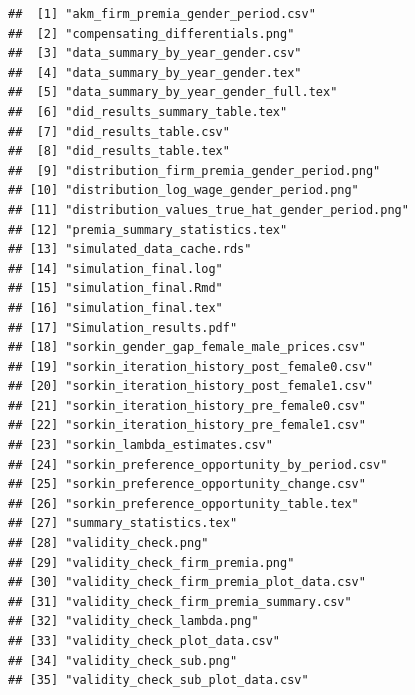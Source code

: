 \documentclass[
]{article}
\begin{document}
\begin{verbatim}
##  [1] "akm_firm_premia_gender_period.csv"             
##  [2] "compensating_differentials.png"                
##  [3] "data_summary_by_year_gender.csv"               
##  [4] "data_summary_by_year_gender.tex"               
##  [5] "data_summary_by_year_gender_full.tex"          
##  [6] "did_results_summary_table.tex"                 
##  [7] "did_results_table.csv"                         
##  [8] "did_results_table.tex"                         
##  [9] "distribution_firm_premia_gender_period.png"    
## [10] "distribution_log_wage_gender_period.png"       
## [11] "distribution_values_true_hat_gender_period.png"
## [12] "premia_summary_statistics.tex"                 
## [13] "simulated_data_cache.rds"                      
## [14] "simulation_final.log"                          
## [15] "simulation_final.Rmd"                          
## [16] "simulation_final.tex"                          
## [17] "Simulation_results.pdf"                        
## [18] "sorkin_gender_gap_female_male_prices.csv"      
## [19] "sorkin_iteration_history_post_female0.csv"     
## [20] "sorkin_iteration_history_post_female1.csv"     
## [21] "sorkin_iteration_history_pre_female0.csv"      
## [22] "sorkin_iteration_history_pre_female1.csv"      
## [23] "sorkin_lambda_estimates.csv"                   
## [24] "sorkin_preference_opportunity_by_period.csv"   
## [25] "sorkin_preference_opportunity_change.csv"      
## [26] "sorkin_preference_opportunity_table.tex"       
## [27] "summary_statistics.tex"                        
## [28] "validity_check.png"                            
## [29] "validity_check_firm_premia.png"                
## [30] "validity_check_firm_premia_plot_data.csv"      
## [31] "validity_check_firm_premia_summary.csv"        
## [32] "validity_check_lambda.png"                     
## [33] "validity_check_plot_data.csv"                  
## [34] "validity_check_sub.png"                        
## [35] "validity_check_sub_plot_data.csv"
\end{verbatim}
\end{document}
